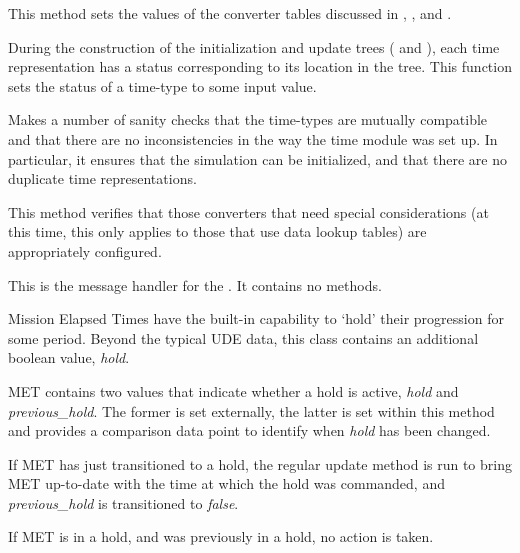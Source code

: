 {\begin{enumerate}
{\begin{enumerate}
This method sets the values of the converter tables discussed in
, 
, and
.

During the construction of the initialization and update trees
( and
), each time 
representation has a status
corresponding to its location in the tree.  This function sets the
status of a time-type to some input value.

\label{ref:verifytimessetup}Makes a number of sanity checks that the
time-types are mutually compatible and that there are no
inconsistencies in the way the time module was set up.  In particular,
it ensures that the simulation can be initialized, and that there are
no duplicate time representations.

This method verifies that those converters that need special
considerations (at this time, this only applies to those that use data lookup
tables) are appropriately configured.



\end{enumerate}}
This is the message handler for the \timeDesc. It contains no methods.



Mission Elapsed Times have the built-in capability to `hold' their progression
for some period.  Beyond the typical UDE data, this class contains an
additional boolean value, \textit{hold}.
\begin{enumerate}

MET contains two values that indicate whether a hold is active, \textit{hold} 
and \textit{previous\_hold}.  The former is set externally, the latter is set 
within this method and provides a comparison data point to identify when 
\textit{hold} has been changed.

If MET has just transitioned to a hold, the regular update method is run to 
bring MET up-to-date with the time at which the hold was commanded, and 
\textit{previous\_hold} is transitioned to \textit{false}.

If MET is in a hold, and was previously in a hold, no action is taken.


\end{enumerate}
\end{enumerate}}
